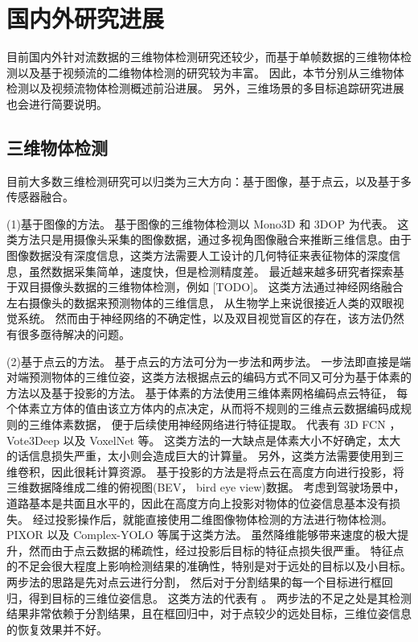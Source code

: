\section{国内外研究进展}
\label{sec:realted_work}
目前国内外针对流数据的三维物体检测研究还较少，而基于单帧数据的三维物体检测以及基于视频流的二维物体检测的研究较为丰富。 因此，本节分别从三维物体检测以及视频流物体检测概述前沿进展。 另外，三维场景的多目标追踪研究进展也会进行简要说明。

\subsection{三维物体检测}
\label{3d_detect}
目前大多数三维检测研究可以归类为三大方向：基于图像，基于点云，以及基于多传感器融合。 

(1)基于图像的方法。 基于图像的三维物体检测以 Mono3D \cite{7780605} 和 3DOP \cite{chen20183d} 为代表。 这类方法只是用摄像头采集的图像数据，通过多视角图像融合来推断三维信息。由于图像数据没有深度信息，这类方法需要人工设计的几何特征来表征物体的深度信息，虽然数据采集简单，速度快，但是检测精度差。 最近越来越多研究者探索基于双目摄像头数据的三维物体检测，例如 [TODO]。 这类方法通过神经网络融合左右摄像头的数据来预测物体的三维信息， 从生物学上来说很接近人类的双眼视觉系统。 然而由于神经网络的不确定性，以及双目视觉盲区的存在，该方法仍然有很多亟待解决的问题。

(2)基于点云的方法。 基于点云的方法可分为一步法和两步法。 一步法即直接是端对端预测物体的三维位姿，这类方法根据点云的编码方式不同又可分为基于体素的方法以及基于投影的方法。 基于体素的方法使用三维体素网格编码点云特征， 每个体素立方体的值由该立方体内的点决定，从而将不规则的三维点云数据编码成规则的三维体素数据， 便于后续使用神经网络进行特征提取。 代表有 3D FCN \cite{li20173d}， Vote3Deep \cite{engelcke2017vote3deep}以及 VoxelNet \cite{zhou2018voxelnet}等。 这类方法的一大缺点是体素大小不好确定，太大的话信息损失严重，太小则会造成巨大的计算量。 另外，这类方法需要使用到三维卷积，因此很耗计算资源。 基于投影的方法是将点云在高度方向进行投影，将三维数据降维成二维的俯视图(BEV， bird eye view)数据。 考虑到驾驶场景中， 道路基本是共面且水平的，因此在高度方向上投影对物体的位姿信息基本没有损失。 经过投影操作后，就能直接使用二维图像物体检测的方法进行物体检测。 PIXOR \cite{yang2018pixor} 以及 Complex-YOLO \cite{simon2018complex,Simon_2019_CVPR_Workshops} 等属于这类方法。 虽然降维能够带来速度的极大提升，然而由于点云数据的稀疏性，经过投影后目标的特征点损失很严重。 特征点的不足会很大程度上影响检测结果的准确性，特别是对于远处的目标以及小目标。 两步法的思路是先对点云进行分割， 然后对于分割结果的每一个目标进行框回归，得到目标的三维位姿信息。 这类方法的代表有 \cite{shi2019pointrcnn}。 两步法的不足之处是其检测结果非常依赖于分割结果，且在框回归中，对于点较少的远处目标，三维位姿信息的恢复效果并不好。

